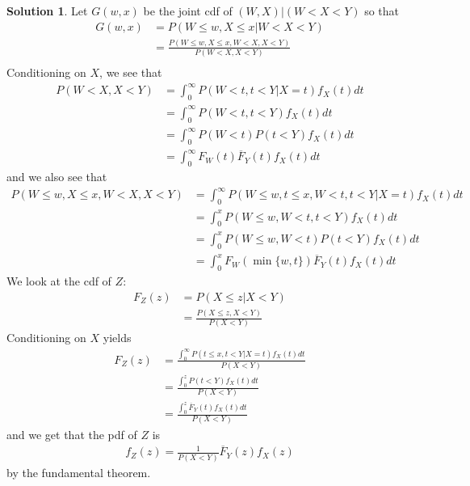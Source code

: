 \documentclass[11pt]{amsart}
\theoremstyle{definition}
\newtheorem{solution}[theorem]{Solution}
\numberwithin{equation}{section}
\begin{document}
 \begin{solution}
     Let $G(w,x)$ be the joint cdf of $(W,X)|(W<X<Y)$ so that
     \begin{align*}
         G(w,x)&=P(W\le w, X\le x|W<X<Y)\\
         &=\frac{P(W\le w, X\le x, W<X, X<Y)}{P(W<X, X<Y)}\\
     \end{align*}
     Conditioning on $X$, we see that
     \begin{align*}
         P(W<X,X<Y)&=\int_0^\infty P(W<t, t<Y|X=t)f_X(t)dt\\
         &=\int_0^\infty P(W<t, t<Y)f_X(t)dt\\
         &=\int_0^\infty P(W<t)P(t<Y)f_X(t)dt\\
         &=\int_0^\infty F_W(t)\overline{F}_Y(t)f_X(t)dt
     \end{align*}
     and we also see that
     \begin{align*}
         P(W\le w, X\le x, W<X, X<Y)&=\int_0^\infty P(W\le w, t\le x, W<t, t< Y|X=t)f_X(t)dt\\
         &=\int_0^x P(W\le w, W<t, t<Y)f_X(t)dt\\
         &=\int_0^x P(W\le w, W<t)P(t<Y)f_X(t)dt\\
         &=\int_0^x F_W(\min\{w,t\})\overline{F}_Y(t)f_X(t)dt
     \end{align*}
     We look at the cdf of $Z$:
     \begin{align*}
         F_Z(z)&=P(X\le z|X<Y)\\
         &=\frac{P(X\le z, X<Y)}{P(X<Y)}
     \end{align*}
     Conditioning on $X$ yields
     \begin{align*}
         F_Z(z)&=\frac{\int_0^\infty P(t\le x, t<Y|X=t)f_X(t)dt}{P(X<Y)}\\
         &=\frac{\int_0^zP(t<Y)f_X(t)dt}{P(X<Y)}\\
         &=\frac{\int_0^z\overline{F}_Y(t)f_X(t)dt}{P(X<Y)}
     \end{align*}
     and we get that the pdf of $Z$ is
     \begin{align*}
         f_Z(z)=\frac{1}{P(X<Y)}\overline{F}_Y(z)f_X(z)
     \end{align*}
     by the fundamental theorem.


\end{solution}
\end{document}
